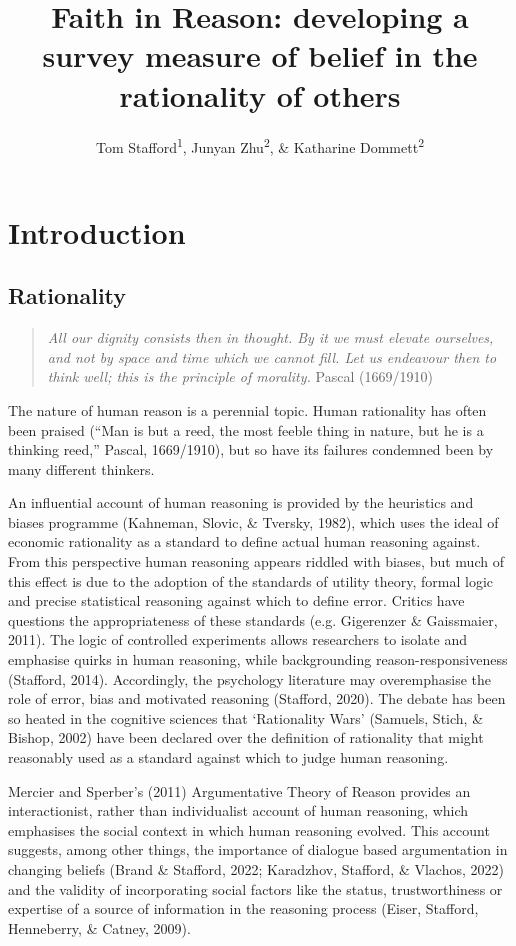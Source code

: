 \documentclass[
  ,jou,floatsintext]{apa6}
\title{Faith in Reason: developing a survey measure of belief in the rationality of others}
\author{Tom Stafford\textsuperscript{1}, Junyan Zhu\textsuperscript{2}, \& Katharine Dommett\textsuperscript{2}}
\date{}
\affiliation{\vspace{0.5cm}\textsuperscript{1} Department of Psychology, University of Sheffield, UK\\\textsuperscript{2} Department of Politics and International Relations, University of Sheffield, UK}
\begin{document}
\maketitle

\hypertarget{introduction}{%
\section{Introduction}\label{introduction}}

\hypertarget{rationality}{%
\subsection{Rationality}\label{rationality}}

\begin{quote}
\emph{All our dignity consists then in thought. By it we must elevate ourselves, and not by space and time which we cannot fill. Let us endeavour then to think well; this is the principle of morality.}
Pascal (1669/1910)
\end{quote}

The nature of human reason is a perennial topic. Human rationality has often been praised (``Man is but a reed, the most feeble thing in nature, but he is a thinking reed,'' Pascal, 1669/1910), but so have its failures condemned been by many different thinkers.

An influential account of human reasoning is provided by the heuristics and biases programme (Kahneman, Slovic, \& Tversky, 1982), which uses the ideal of economic rationality as a standard to define actual human reasoning against. From this perspective human reasoning appears riddled with biases, but much of this effect is due to the adoption of the standards of utility theory, formal logic and precise statistical reasoning against which to define error. Critics have questions the appropriateness of these standards (e.g. Gigerenzer \& Gaissmaier, 2011). The logic of controlled experiments allows researchers to isolate and emphasise quirks in human reasoning, while backgrounding reason-responsiveness (Stafford, 2014). Accordingly, the psychology literature may overemphasise the role of error, bias and motivated reasoning (Stafford, 2020). The debate has been so heated in the cognitive sciences that `Rationality Wars' (Samuels, Stich, \& Bishop, 2002) have been declared over the definition of rationality that might reasonably used as a standard against which to judge human reasoning.

Mercier and Sperber's (2011) Argumentative Theory of Reason provides an interactionist, rather than individualist account of human reasoning, which emphasises the social context in which human reasoning evolved. This account suggests, among other things, the importance of dialogue based argumentation in changing beliefs (Brand \& Stafford, 2022; Karadzhov, Stafford, \& Vlachos, 2022) and the validity of incorporating social factors like the status, trustworthiness or expertise of a source of information in the reasoning process (Eiser, Stafford, Henneberry, \& Catney, 2009).
\end{document}
